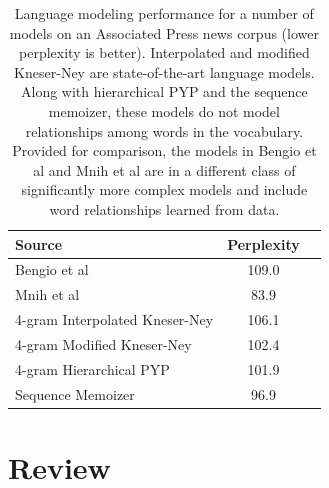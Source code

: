 \documentclass{beamer}
\begin{document}
\begin{frame}
\begin{table}
\begin{center}
\begin{tabular}[t]{lcc}
\hline
{\small Source } & {\small Perplexity} \\
\hline
{\small Bengio et al \cite{Bengio2003} }& 109.0 \\
{\small Mnih et al \cite{Mnih2009}} & \phantom{0}83.9\\
\hline
{\small 4-gram Interpolated Kneser-Ney \cite{Chen1999,Teh2006} }& 106.1 \\
{\small 4-gram Modified Kneser-Ney \cite{Chen1999,Teh2006} }& 102.4 \\
{\small 4-gram Hierarchical PYP \cite{Teh2006} } & 101.9 \\
{\small Sequence Memoizer} \cite{Wood2009}& \phantom{0}96.9\\
\hline
\end{tabular}
\end{center}
 \caption{Language modeling performance for a number of models on an Associated Press news corpus (lower perplexity is better).  Interpolated and modified Kneser-Ney are state-of-the-art language models.  Along with hierarchical PYP and the sequence memoizer, these models do not model relationships among words in the vocabulary.  Provided for comparison, the models in Bengio et al and Mnih et al are in a different class of significantly more complex models and include word relationships learned from data.}
\label{table:ap_perplexities}
\end{table}

\end{frame}

\section{Review}
\end{document}
